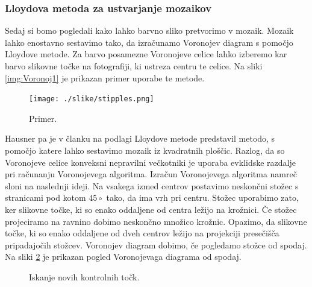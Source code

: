 \subsubsection{Lloydova metoda za ustvarjanje mozaikov}
%
Sedaj si bomo pogledali kako lahko barvno sliko pretvorimo v mozaik. Mozaik lahko enostavno sestavimo tako, da izračunamo Voronojev diagram s pomočjo Lloydove metode. Za barvo posamezne Voronojeve celice lahko izberemo kar barvo slikovne točke na fotografiji, ki ustreza centru te celice. Na sliki \ref{img:Voronoj1} je prikazan primer uporabe te metode.
%
\begin{figure}[htb]
\centering
\texttt{[image: ./slike/stipples.png]}
\caption{Primer.}
\label{fig:Voronoj1}
\end{figure}
%

Hausner pa je v članku \cite{Hausner} na podlagi Lloydove metode predstavil metodo, s pomočjo katere lahko sestavimo mozaik iz kvadratnih ploščic. Razlog, da so Voronojeve celice konveksni nepravilni večkotniki je uporaba evklidske razdalje pri računanju Voronojevega algoritma. Izračun Voronojevega algoritma namreč sloni na naslednji ideji. Na vsakega izmed centrov postavimo neskončni stožec s stranicami pod kotom $45 \circ$ tako, da ima vrh pri centru. Stožec uporabimo zato, ker slikovne točke, ki so enako oddaljene od centra ležijo na krožnici. Če stožec projeciramo na ravnino dobimo neskončno množico krožnic. Opazimo, da slikovne točke, ki so enako oddaljene od dveh centrov ležijo na projekciji presečišča pripadajočih stožcev. Voronojev diagram dobimo, če pogledamo stožce od spodaj. %
Na sliki \ref{fig:VoronojStozci} je prikazan pogled Voronojevaga diagrama od spodaj.
%
\begin{figure}[htbp]
%
\centering
{}
%
%
\caption{Iskanje novih kontrolnih točk.}
\label{fig:VoronojStozci}
\end{figure}
%

